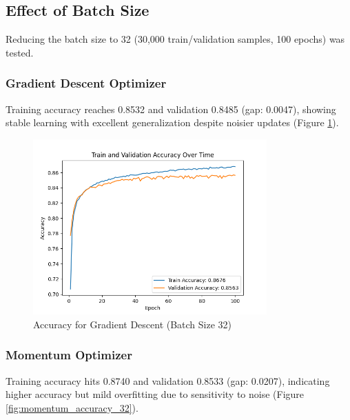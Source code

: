 \documentclass{article}
\begin{document}
\subsection{Effect of Batch Size}

Reducing the batch size to 32 (30,000 train/validation samples, 100 epochs) was tested.

\subsubsection{Gradient Descent Optimizer}

Training accuracy reaches 0.8532 and validation 0.8485 (gap: 0.0047), showing stable learning with excellent generalization despite noisier updates (Figure \ref{fig:gd_accuracy_32}).

\begin{figure}[H]
    \centering
    \includegraphics[width=0.8\textwidth]{assets/q2/gradient_descent/accuracy_100_epochs_30k_train_split_batch_32.png}
    \caption{Accuracy for Gradient Descent (Batch Size 32)}
    \label{fig:gd_accuracy_32}
\end{figure}

\subsubsection{Momentum Optimizer}

Training accuracy hits 0.8740 and validation 0.8533 (gap: 0.0207), indicating higher accuracy but mild overfitting due to sensitivity to noise (Figure \ref{fig:momentum_accuracy_32}).
\end{document}

